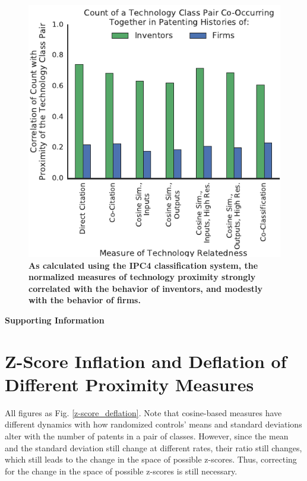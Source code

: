\documentclass[]{svjour3}
\newcommand{\beginsupplement}{%
\setcounter{table}{0}    \renewcommand{\thetable}{S\arabic{table}}     \setcounter{figure}{0} \renewcommand{\thefigure}{S\arabic{figure}}
\setcounter{section}{0} \renewcommand{\thesection}{S\arabic{section}}
}
\begin{document}
\begin{figure}[p!]
\centering
\includegraphics[width=.7\textwidth]{figs/Relatedness_Behavior_Correlation_IPC4.pdf} 
\caption{\textbf{As calculated using the IPC4 classification system, the normalized measures of technology proximity strongly correlated with the behavior of inventors, and modestly with the behavior of firms.}}
\end{figure}


\clearpage
\printbibliography

\newpage
\beginsupplement
\pagebreak
\clearpage

\begin{center}
\textbf{\large Supporting Information}
\end{center}
\section{Z-Score Inflation and Deflation of Different Proximity Measures}
All figures as Fig. \ref{z-score_deflation}. Note that cosine-based measures have different dynamics with how randomized controls' means and standard deviations alter with the number of patents in a pair of classes. However, since the mean and the standard deviation still change at different rates, their ratio still changes, which still leads to the change in the space of possible z-scores. Thus, correcting for the change in the space of possible z-scores is still necessary.
\end{document}
